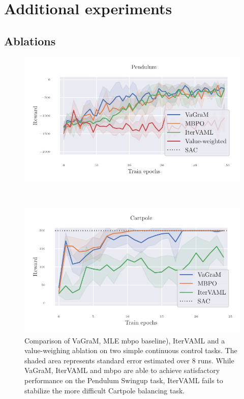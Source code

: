 \section{Additional experiments}

\subsection{Ablations}

\begin{figure}[t]
\begin{minipage}{.48\textwidth}
    \centering
    \includegraphics[width=\textwidth]{figures/vagram/pendulum_all.pdf}
\end{minipage}~
\begin{minipage}{.48\textwidth}
    \centering
    \includegraphics[width=\textwidth]{figures/vagram/cartpole.pdf}
\end{minipage}
    \caption{Comparison of VaGraM, MLE \ac{mbpo} baseline), IterVAML \textcite{itervaml} and a value-weighing ablation on two simple continuous control tasks. The shaded area represents standard error estimated over 8 runs. While VaGraM, IterVAML and \ac{mbpo} are able to achieve satisfactory performance on the Pendulum Swingup task, IterVAML fails to stabilize the more difficult Cartpole balancing task.}
    \label{fig:ablations}
\end{figure}

